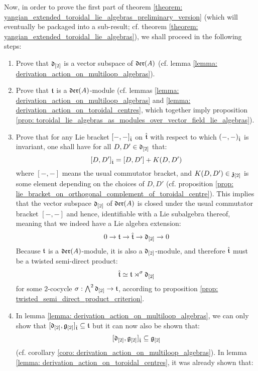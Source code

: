         Now, in order to prove the first part of theorem \ref{theorem: yangian_extended_toroidal_lie_algebras_preliminary_version} (which will eventually be packaged into a sub-result; cf. theorem \ref{theorem: yangian_extended_toroidal_lie_algebras}), we shall proceed in the following steps:
        \begin{enumerate}
            \item Prove that $\mathfrak{d}_{[2]}$ is a vector subspace of $\mathfrak{der}(A)$ (cf. lemma \ref{lemma: derivation_action_on_multiloop_algebras}).
            \item Prove that $\mathfrak{t}$ is a $\mathfrak{der}(A)$-module (cf. lemmas \ref{lemma: derivation_action_on_multiloop_algebras} and \ref{lemma: derivation_action_on_toroidal_centres}, which together imply proposition \ref{prop: toroidal_lie_algebras_as_modules_over_vector_field_lie_algebras}).
            \item Prove that for any Lie bracket $[-, -]_{\hat{\mathfrak{t}}}$ on $\hat{\mathfrak{t}}$ with respect to which $(-, -)_{\hat{\mathfrak{t}}}$ is invariant, one shall have for all $D, D' \in \mathfrak{d}_{[2]}$ that:
                $$[D, D']_{\hat{\mathfrak{t}}} = [D, D'] + K(D, D')$$
            where $[-, -]$ means the usual commutator bracket, and $K(D, D') \in \mathfrak{z}_{[2]}$ is some element depending on the choices of $D, D'$ (cf. proposition \ref{prop: lie_bracket_on_orthogonal_complement_of_toroidal_centre}). This implies that the vector subspace $\mathfrak{d}_{[2]}$ of $\mathfrak{der}(A)$ is closed under the usual commutator bracket $[-, -]$ and hence, identifiable with a Lie subalgebra thereof, meaning that we indeed have a Lie algebra extension:
                $$0 \to \mathfrak{t} \to \hat{\mathfrak{t}} \to \mathfrak{d}_{[2]} \to 0$$
            Because $\mathfrak{t}$ is a $\mathfrak{der}(A)$-module, it is also a $\mathfrak{d}_{[2]}$-module, and therefore $\hat{\mathfrak{t}}$ must be a twisted semi-direct product:
                $$\hat{\mathfrak{t}} \simeq \mathfrak{t} \rtimes^{\sigma} \mathfrak{d}_{[2]}$$
            for some $2$-cocycle $\sigma: \bigwedge^2 \mathfrak{d}_{[2]} \to \mathfrak{t}$, according to proposition \ref{prop: twisted_semi_direct_product_criterion}.
            \item In lemma \ref{lemma: derivation_action_on_multiloop_algebras}, we can only show that $[\mathfrak{d}_{[2]}, \mathfrak{g}_{[2]}]_{\hat{\mathfrak{t}}} \subseteq \mathfrak{t}$ but it can now also be shown that:
                $$[\mathfrak{d}_{[2]}, \mathfrak{g}_{[2]}]_{\hat{\mathfrak{t}}} \subseteq \mathfrak{g}_{[2]}$$
            (cf. corollary \ref{coro: derivation_action_on_multiloop_algebras}). In lemma \ref{lemma: derivation_action_on_toroidal_centres}, it was already shown that:

\end{enumerate}
